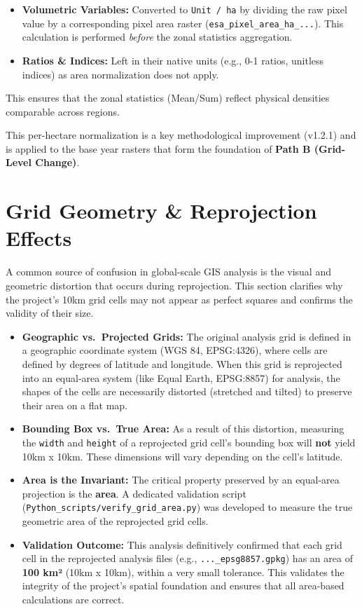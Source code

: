 \documentclass[
  letterpaper,
  DIV=11,
  numbers=noendperiod]{scrreprt}
\providecommand{\tightlist}{%
  \setlength{\itemsep}{0pt}\setlength{\parskip}{0pt}}
\begin{document}
\begin{itemize}
\tightlist
\item
  \textbf{Volumetric Variables:} Converted to \texttt{Unit\ /\ ha} by
  dividing the raw pixel value by a corresponding pixel area raster
  (\texttt{esa\_pixel\_area\_ha\_...}). This calculation is performed
  \emph{before} the zonal statistics aggregation.
\item
  \textbf{Ratios \& Indices:} Left in their native units (e.g., 0-1
  ratios, unitless indices) as area normalization does not apply.
\end{itemize}

This ensures that the zonal statistics (Mean/Sum) reflect physical
densities comparable across regions.

This per-hectare normalization is a key methodological improvement
(v1.2.1) and is applied to the base year rasters that form the
foundation of \textbf{Path B (Grid-Level Change)}.

\section{Grid Geometry \& Reprojection
Effects}\label{grid-geometry-reprojection-effects}

A common source of confusion in global-scale GIS analysis is the visual
and geometric distortion that occurs during reprojection. This section
clarifies why the project's 10km grid cells may not appear as perfect
squares and confirms the validity of their size.

\begin{itemize}
\tightlist
\item
  \textbf{Geographic vs.~Projected Grids:} The original analysis grid is
  defined in a geographic coordinate system (WGS 84, EPSG:4326), where
  cells are defined by degrees of latitude and longitude. When this grid
  is reprojected into an equal-area system (like Equal Earth, EPSG:8857)
  for analysis, the shapes of the cells are necessarily distorted
  (stretched and tilted) to preserve their area on a flat map.
\item
  \textbf{Bounding Box vs.~True Area:} As a result of this distortion,
  measuring the \texttt{width} and \texttt{height} of a reprojected grid
  cell's bounding box will \textbf{not} yield 10km x 10km. These
  dimensions will vary depending on the cell's latitude.
\item
  \textbf{Area is the Invariant:} The critical property preserved by an
  equal-area projection is the \textbf{area}. A dedicated validation
  script (\texttt{Python\_scripts/verify\_grid\_area.py}) was developed
  to measure the true geometric area of the reprojected grid cells.
\item
  \textbf{Validation Outcome:} This analysis definitively confirmed that
  each grid cell in the reprojected analysis files (e.g.,
  \texttt{...\_epsg8857.gpkg}) has an area of \textbf{100 km²} (10km x
  10km), within a very small tolerance. This validates the integrity of
  the project's spatial foundation and ensures that all area-based
  calculations are correct.
\end{itemize}
\end{document}
